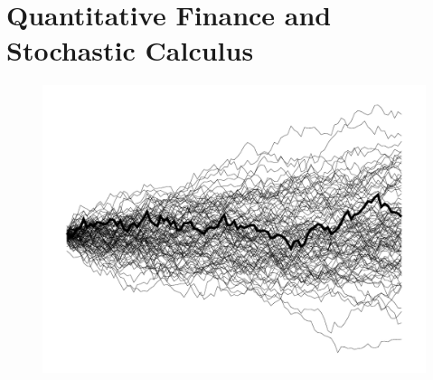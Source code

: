 \graphicspath{{/home/davibarreira/MEGA/EMAp/Mathematical-Short-Notes/Book/fields/Quantitative-Finance/}}

\chapter{Quantitative Finance and Stochastic Calculus}

\begin{figure}[H]
	\begin{center}
    \includegraphics[width=1.0\textwidth]{./figures/quantfig.pdf}
	\end{center}
\end{figure}
